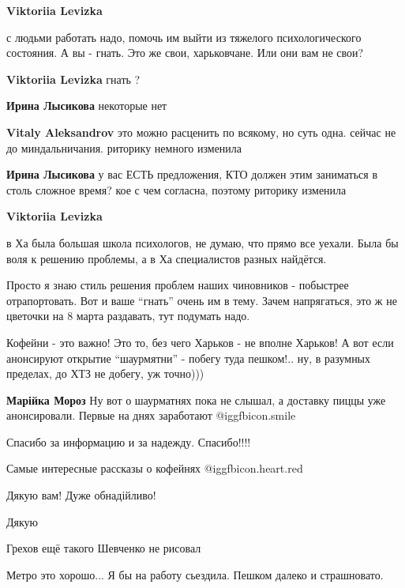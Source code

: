 \begin{itemize}
\begin{itemize} %
\textbf{Viktoriia Levizka} 

с людьми работать надо, помочь им выйти из тяжелого психологического состояния.
А вы - гнать. Это же свои, харьковчане. Или они вам не свои?

\textbf{Viktoriia Levizka} гнать ?

\textbf{Ирина Лысикова} некоторые нет

\textbf{Vitaly Aleksandrov} это можно расценить по всякому, но суть одна. сейчас не до миндальничания. риторику немного изменила

\textbf{Ирина Лысикова} у вас ЕСТЬ предложения, КТО должен этим заниматься в столь сложное время? кое с чем согласна, поэтому риторику изменила

\textbf{Viktoriia Levizka} 

в Ха была большая школа психологов, не думаю, что прямо все уехали. Была бы
воля к решению проблемы, а в Ха специалистов разных найдётся.

Просто я знаю стиль решения проблем наших чиновников - побыстрее отрапортовать.
Вот и ваше \enquote{гнать} очень им в тему. Зачем напрягаться, это ж не цветочки на 8
марта раздавать, тут подумать надо.

\end{itemize} %


Кофейни - это важно! Это то, без чего Харьков - не вполне Харьков! А вот если
анонсируют открытие \enquote{шаурмятни} - побегу туда пешком!.. ну, в разумных
пределах, до ХТЗ не добегу, уж точно)))

\textbf{Марійка Мороз} Ну вот о шаурматнях пока не слышал, а доставку пиццы уже анонсировали. Первые на днях заработают  @igg{fbicon.smile} 

Спасибо за информацию и за надежду. Спасибо!!!!

Самые интересные рассказы о кофейнях @igg{fbicon.heart.red}

Дякую вам! Дуже обнадійливо!

Дякую

Грехов ещё такого Шевченко не рисовал

Метро это хорошо... Я бы на работу сьездила. Пешком далеко и страшновато.


\end{itemize}
